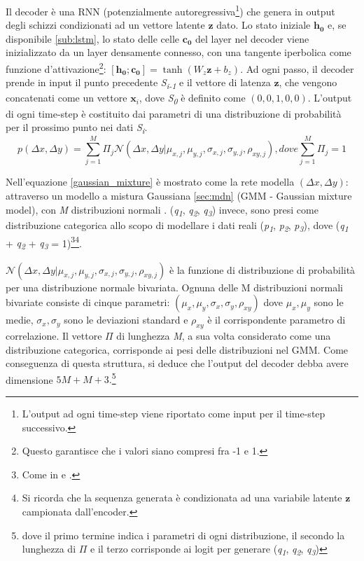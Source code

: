 Il decoder è una RNN (potenzialmente autoregressiva\footnote{L'output ad ogni time-step viene riportato come input per il time-step successivo.}) che genera in output degli schizzi condizionati ad un vettore latente $\boldsymbol{z}$ dato. Lo stato iniziale $\boldsymbol{h_0}$ e, se disponibile \ref{sub:lstm}, lo stato delle celle $\boldsymbol{c_0}$ del layer nel decoder viene inizializzato da un layer densamente connesso, con una tangente iperbolica come funzione d'attivazione\footnote{Questo garantisce che i valori siano compresi fra -1 e 1.}: $[\boldsymbol{h_0} ; \boldsymbol{c_0}] = \tanh(W_z \boldsymbol{z} + b_z)$.
Ad ogni passo, il decoder prende in input il punto precedente \textit{S\textsubscript{i-1}} e il vettore di latenza $\boldsymbol{z}$, che vengono concatenati come un vettore $\boldsymbol{x}_i$, dove \textit{S\textsubscript{0}} è definito come $(0, 0, 1, 0, 0)$. L'output di ogni time-step è costituito dai parametri di una distribuzione di probabilità per il prossimo punto nei dati \textit{S\textsubscript{i}}.
\begin{equation}
	\label{gaussian_mixture}
	p(\Delta x, \Delta y) = \sum_{j=1}^M \Pi_j \mathcal{N}(\Delta x, \Delta y | \mu_{x,j}, \mu_{y,j}, \sigma_{x,j}, \sigma_{y,j}, \rho_{xy, j}), dove \sum_{j=1}^M \Pi_j = 1
\end{equation}

Nell'equazione \ref{gaussian_mixture} è mostrato come la rete modella $(\Delta x, \Delta y)$: attraverso un modello a mistura Gaussiana \ref{sec:mdn} (GMM - Gaussian mixture model), con \textit{M} distribuzioni normali \cite{gmm}. (\textit{q\textsubscript{1}}, \textit{q\textsubscript{2}}, \textit{q\textsubscript{3}}) invece, sono presi come distribuzione categorica allo scopo di modellare i dati reali (\textit{p\textsubscript{1}}, \textit{p\textsubscript{2}}, \textit{p\textsubscript{3}}), dove (\textit{q\textsubscript{1}} + \textit{q\textsubscript{2}} + \textit{q\textsubscript{3}} = 1)\footnote{Come in \cite{fake_chinese} e \cite{draw_chinese}.}\footnote{Si ricorda che la sequenza generata è condizionata ad una variabile latente $\boldsymbol{z}$ campionata dall'encoder.}.

$\mathcal{N}(\Delta x, \Delta y | \mu_{x,j}, \mu_{y,j}, \sigma_{x,j}, \sigma_{y,j}, \rho_{xy, j})$ è la funzione di distribuzione di probabilità per una distribuzione normale bivariata. Ognuna delle M distribuzioni normali bivariate consiste di cinque parametri: $(\mu_{x}, \mu_{y}, \sigma_{x}, \sigma_{y}, \rho_{xy})$ dove $\mu_{x}, \mu_{y}$ sono le medie, $\sigma_{x}, \sigma_{y}$ sono le deviazioni standard e $\rho_{xy}$ è il corrispondente parametro di correlazione. Il vettore $\Pi$ di lunghezza \textit{M}, a sua volta considerato come una distribuzione categorica, corrisponde ai pesi delle distribuzioni nel GMM. Come conseguenza di questa struttura, si deduce che l'output del decoder debba avere dimensione $5M + M + 3.$\footnote{dove il primo termine indica i parametri di ogni distribuzione, il secondo la lunghezza di $\Pi$ e il terzo corrisponde ai logit per generare (\textit{q\textsubscript{1}}, \textit{q\textsubscript{2}}, \textit{q\textsubscript{3}})}


